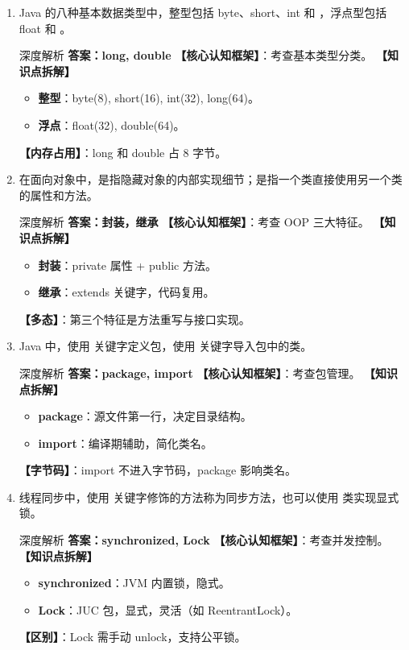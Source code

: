 \documentclass[12pt, a4paper]{ctexart}
\newcommand{\blank}{\underline{\hspace{2em}}}
\begin{document}
\begin{enumerate}[label=\textbf{\arabic*.}, itemsep=1em]
    \item Java 的八种基本数据类型中，整型包括 byte、short、int 和 \blank，浮点型包括 float 和 \blank。
    \begin{bluebox}{深度解析}
    \textbf{答案：long, double}
    \textbf{【核心认知框架】}：考查基本类型分类。
    \textbf{【知识点拆解】}
    \begin{itemize}[leftmargin=*, nosep]
        \item \textbf{整型}：byte(8), short(16), int(32), long(64)。
        \item \textbf{浮点}：float(32), double(64)。
    \end{itemize}
    \textbf{【内存占用】}：long 和 double 占 8 字节。
    \end{bluebox}

    \item 在面向对象中，\blank 是指隐藏对象的内部实现细节；\blank 是指一个类直接使用另一个类的属性和方法。
    \begin{bluebox}{深度解析}
    \textbf{答案：封装，继承}
    \textbf{【核心认知框架】}：考查 OOP 三大特征。
    \textbf{【知识点拆解】}
    \begin{itemize}[leftmargin=*, nosep]
        \item \textbf{封装}：private 属性 + public 方法。
        \item \textbf{继承}：extends 关键字，代码复用。
    \end{itemize}
    \textbf{【多态】}：第三个特征是方法重写与接口实现。
    \end{bluebox}

    \item Java 中，使用 \blank 关键字定义包，使用 \blank 关键字导入包中的类。
    \begin{bluebox}{深度解析}
    \textbf{答案：package, import}
    \textbf{【核心认知框架】}：考查包管理。
    \textbf{【知识点拆解】}
    \begin{itemize}[leftmargin=*, nosep]
        \item \textbf{package}：源文件第一行，决定目录结构。
        \item \textbf{import}：编译期辅助，简化类名。
    \end{itemize}
    \textbf{【字节码】}：import 不进入字节码，package 影响类名。
    \end{bluebox}

    \item 线程同步中，使用 \blank 关键字修饰的方法称为同步方法，也可以使用 \blank 类实现显式锁。
    \begin{bluebox}{深度解析}
    \textbf{答案：synchronized, Lock}
    \textbf{【核心认知框架】}：考查并发控制。
    \textbf{【知识点拆解】}
    \begin{itemize}[leftmargin=*, nosep]
        \item \textbf{synchronized}：JVM 内置锁，隐式。
        \item \textbf{Lock}：JUC 包，显式，灵活（如 ReentrantLock）。
    \end{itemize}
    \textbf{【区别】}：Lock 需手动 unlock，支持公平锁。
    \end{bluebox}


\end{enumerate}
\end{document}
